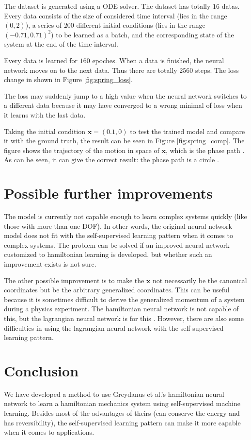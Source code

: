 \documentclass{article}
\begin{document}
The dataset is generated using a ODE solver.
The dataset has totally $16$ datas.
Every data consists of the size of considered time interval
(lies in the range $\left(0,2\right)$),
a series of $200$ different initial conditions
(lies in the range $\left(-0.71,0.71\right)^2$)
to be learned as a batch,
and the corresponding state of the system at the end of the time interval.

Every data is learned for $160$ epoches.
When a data is finished, the neural network moves on to the next data.
Thus there are totally $2560$ steps.
The loss change in shown in Figure \ref{fig:spring_loss}.

The loss may suddenly jump to a high value when the neural network switches to a different data
because it may have converged to a wrong minimal of loss when it learns with the last data.

Taking the initial condition $\mathbf x=\left(0.1,0\right)$
to test the trained model and compare it with the ground truth,
the result can be seen in Figure \ref{fig:spring_comp}.
The figure shows the trajectory of the motion in space of $\mathbf x$,
which is the phase path \cite[p. 146]{landau1976mechanics}\cite[p. 68]{arnold1989mathmech}.
As can be seen, it can give the correct result:
the phase path is a circle \cite[p. 17]{arnold1989mathmech}.

\section{Possible further improvements}

The model is currently not capable enough to learn complex systems quickly
(like those with more than one DOF).
In other words, the original neural network model does not fit with the self-supervised learning pattern when it comes to complex systems.
The problem can be solved if an improved neural network customized to hamiltonian learning is developed,
but whether such an improvement exists is not sure.

The other possible improvement is to make the $\mathbf x$ not necessarily be the canonical coordinates but be the arbitrary generalized coordinates.
This can be useful because it is sometimes difficult to derive the generalized momentum of a system during a physics experiment.
The hamiltonian neural network is not capable of this, but the lagrangian neural network is for this \cite{cranmer2020lagrangian}.
However, there are also some difficulties in using the lagrangian neural network with the self-supervised learning pattern.

\section{Conclusion}

We have developed a method to use Greydanus et al.'s hamiltonian neural network \cite{greydanus2019hamiltonian}
to learn a hamiltonian mechanics system using self-supervised machine learning.
Besides most of the advantages of theirs (can conserve the energy and has reversibility),
the self-supervised learning pattern can make it more capable when it comes to applications.



\end{document}
